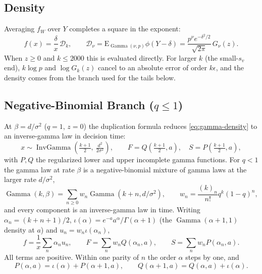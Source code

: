 \documentclass[12pt]{article}
\newcommand{\phiN}{\phi}
\begin{document}
\subsection{Density}
Averaging $f_W$ over $Y$ completes a square in the exponent:
\begin{equation}
  f(x)=\frac\delta x\,\mathcal D_k,\qquad
  \mathcal D_\nu=\mathrm E_{\operatorname{Gamma}(\nu,p)}\phiN(Y-\delta)
  =\frac{p^\nu e^{-\delta^2/2}}{\sqrt{2\pi}}\,G_\nu(z).
  \label{eq:gamma-density}
\end{equation}
When $z\ge0$ and $k\le2000$ this is evaluated directly. For larger $k$ (the small-$s_v$ end), $k\log p$ and $\log G_k(z)$ cancel to an absolute error of order $k\epsilon$, and the density comes from the branch used for the tails below.

\subsection{Negative-Binomial Branch (\texorpdfstring{$q\le1$}{q <= 1})}
At $\beta=d/\sigma^2$ ($q=1$, $z=0$) the duplication formula reduces
\eqref{eq:gamma-density} to an inverse-gamma law in decision time:
\begin{equation}
  x\sim\operatorname{InvGamma}\!\left(\tfrac{k+1}{2},\ \tfrac{d^2}{2\sigma^2}\right),
  \qquad F=Q\!\left(\tfrac{k+1}2,a\right),\quad S=P\!\left(\tfrac{k+1}2,a\right),
\end{equation}
with $P,Q$ the regularized lower and upper incomplete gamma functions. For $q<1$ the gamma law at rate $\beta$ is a negative-binomial mixture of gamma laws at the larger rate $d/\sigma^2$,
\begin{equation}
  \operatorname{Gamma}(k,\beta)=\sum_{n\ge0}w_n\operatorname{Gamma}(k+n,d/\sigma^2),
  \qquad w_n=\frac{(k)_n}{n!}q^k(1-q)^n,
\end{equation}
and every component is an inverse-gamma law in time. Writing $\alpha_n=(k+n+1)/2$, $\iota(\alpha)=e^{-a}a^\alpha/\Gamma(\alpha+1)$ (the $\operatorname{Gamma}(\alpha+1,1)$ density at $a$) and $u_n=w_n\iota(\alpha_n)$,
\begin{equation}
  f=\frac1x\sum_n\alpha_nu_n,\qquad
  F=\sum_nw_nQ(\alpha_n,a),\qquad
  S=\sum_nw_nP(\alpha_n,a).
\end{equation}
All terms are positive. Within one parity of $n$ the order $\alpha$ steps by one, and
\begin{equation}
  P(\alpha,a)=\iota(\alpha)+P(\alpha+1,a),\qquad Q(\alpha+1,a)=Q(\alpha,a)+\iota(\alpha).
\end{equation}
\end{document}
